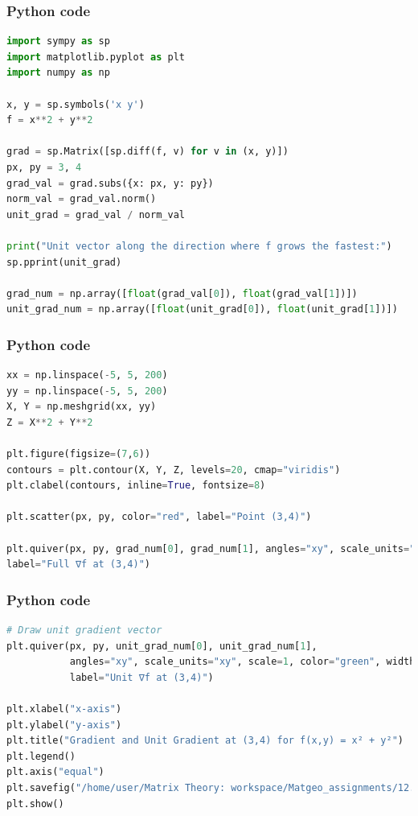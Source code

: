 \documentclass{beamer}
\begin{document}
\begin{frame}[fragile]
    \frametitle{Python code}
    \begin{lstlisting}[language=Python]
import sympy as sp
import matplotlib.pyplot as plt
import numpy as np

x, y = sp.symbols('x y')
f = x**2 + y**2

grad = sp.Matrix([sp.diff(f, v) for v in (x, y)])
px, py = 3, 4
grad_val = grad.subs({x: px, y: py})
norm_val = grad_val.norm()
unit_grad = grad_val / norm_val

print("Unit vector along the direction where f grows the fastest:")
sp.pprint(unit_grad)

grad_num = np.array([float(grad_val[0]), float(grad_val[1])])  
unit_grad_num = np.array([float(unit_grad[0]), float(unit_grad[1])])  
    \end{lstlisting}   
\end{frame}

\begin{frame}[fragile]
    \frametitle{Python code}
    \begin{lstlisting}[language=Python]
xx = np.linspace(-5, 5, 200)
yy = np.linspace(-5, 5, 200)
X, Y = np.meshgrid(xx, yy)
Z = X**2 + Y**2

plt.figure(figsize=(7,6))
contours = plt.contour(X, Y, Z, levels=20, cmap="viridis")
plt.clabel(contours, inline=True, fontsize=8)

plt.scatter(px, py, color="red", label="Point (3,4)")

plt.quiver(px, py, grad_num[0], grad_num[1], angles="xy", scale_units="xy", scale=1, color="blue", width=0.005,
label="Full ∇f at (3,4)")
    \end{lstlisting}   
\end{frame}

\begin{frame}[fragile]
    \frametitle{Python code}
    \begin{lstlisting}[language=Python]
# Draw unit gradient vector
plt.quiver(px, py, unit_grad_num[0], unit_grad_num[1], 
           angles="xy", scale_units="xy", scale=1, color="green", width=0.005,
           label="Unit ∇f at (3,4)")

plt.xlabel("x-axis")
plt.ylabel("y-axis")
plt.title("Gradient and Unit Gradient at (3,4) for f(x,y) = x² + y²")
plt.legend()
plt.axis("equal")
plt.savefig("/home/user/Matrix Theory: workspace/Matgeo_assignments/12.560/figs/Figure_1.png")
plt.show()
    \end{lstlisting}   
\end{frame}
\end{document}
